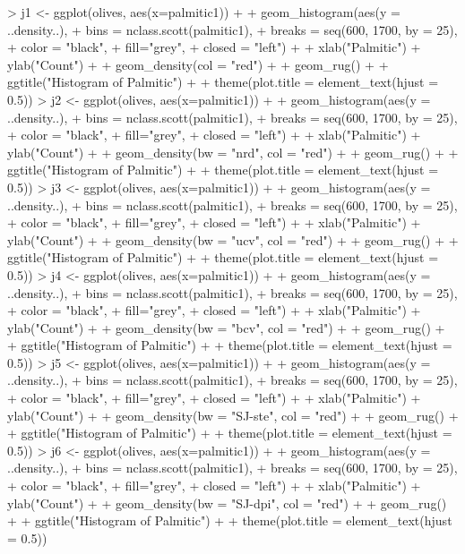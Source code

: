 \documentclass[12pt,letterpaper,final]{article}
\begin{document}
\begin{enumerate}
\begin{enumerate}
\begin{Schunk}
\begin{Sinput}
> j1 <- ggplot(olives, aes(x=palmitic1)) +
+     geom_histogram(aes(y = ..density..),
+     bins = nclass.scott(palmitic1),
+     breaks = seq(600, 1700, by = 25), 
+     color = "black",
+     fill="grey",
+     closed = "left") +
+   xlab("Palmitic") + ylab("Count") +
+   geom_density(col = "red") +
+   geom_rug() +
+   ggtitle("Histogram of Palmitic") + 
+   theme(plot.title = element_text(hjust = 0.5))
> j2 <- ggplot(olives, aes(x=palmitic1)) +
+     geom_histogram(aes(y = ..density..),
+     bins = nclass.scott(palmitic1),
+     breaks = seq(600, 1700, by = 25), 
+     color = "black",
+     fill="grey",
+     closed = "left") +
+   xlab("Palmitic") + ylab("Count") +
+   geom_density(bw = "nrd", col = "red") +
+   geom_rug() +
+   ggtitle("Histogram of Palmitic") + 
+   theme(plot.title = element_text(hjust = 0.5))
> j3 <- ggplot(olives, aes(x=palmitic1)) +
+     geom_histogram(aes(y = ..density..),
+     bins = nclass.scott(palmitic1),
+     breaks = seq(600, 1700, by = 25), 
+     color = "black",
+     fill="grey",
+     closed = "left") +
+   xlab("Palmitic") + ylab("Count") +
+   geom_density(bw = "ucv", col = "red") +
+   geom_rug() +
+   ggtitle("Histogram of Palmitic") + 
+   theme(plot.title = element_text(hjust = 0.5))
> j4 <- ggplot(olives, aes(x=palmitic1)) +
+     geom_histogram(aes(y = ..density..),
+     bins = nclass.scott(palmitic1),
+     breaks = seq(600, 1700, by = 25), 
+     color = "black",
+     fill="grey",
+     closed = "left") +
+   xlab("Palmitic") + ylab("Count") +
+   geom_density(bw = "bcv", col = "red") +
+   geom_rug() +
+   ggtitle("Histogram of Palmitic") + 
+   theme(plot.title = element_text(hjust = 0.5))
> j5 <- ggplot(olives, aes(x=palmitic1)) +
+     geom_histogram(aes(y = ..density..),
+     bins = nclass.scott(palmitic1),
+     breaks = seq(600, 1700, by = 25), 
+     color = "black",
+     fill="grey",
+     closed = "left") +
+   xlab("Palmitic") + ylab("Count") +
+   geom_density(bw = "SJ-ste", col = "red") +
+   geom_rug() +
+   ggtitle("Histogram of Palmitic") + 
+   theme(plot.title = element_text(hjust = 0.5))
> j6 <- ggplot(olives, aes(x=palmitic1)) +
+     geom_histogram(aes(y = ..density..),
+     bins = nclass.scott(palmitic1),
+     breaks = seq(600, 1700, by = 25), 
+     color = "black",
+     fill="grey",
+     closed = "left") +
+   xlab("Palmitic") + ylab("Count") +
+   geom_density(bw = "SJ-dpi", col = "red") +
+   geom_rug() +
+   ggtitle("Histogram of Palmitic") + 
+   theme(plot.title = element_text(hjust = 0.5))

\end{Sinput}
\end{Schunk}
\end{enumerate}
\end{enumerate}
\end{document}
